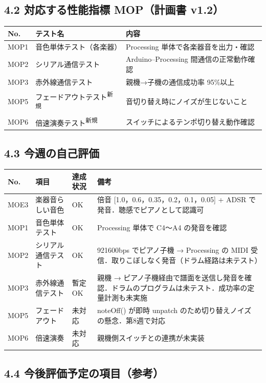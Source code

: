 \documentclass[a4paper,11pt]{ltjsarticle}
\providecommand{\％}{\%}
\begin{document}
\subsection*{4.2 対応する性能指標 MOP（計画書 v1.2）}

\begin{longtable}{|p{1.2cm}|p{3.6cm}|p{9.0cm}|}
\hline
\rowcolor[gray]{0.9}
No. & テスト名 & 内容 \\
\hline
MOP1 & 音色単体テスト（各楽器） & Processing 単体で各楽器音を出力・確認 \\
\hline
MOP2 & シリアル通信テスト & Arduino--Processing 間通信の正常動作確認 \\
\hline
MOP3 & 赤外線通信テスト & 親機→子機の通信成功率 95\％以上 \\
\hline
MOP5 & フェードアウトテスト\textsuperscript{新規} & 音切り替え時にノイズが生じないこと \\
\hline
MOP6 & 倍速演奏テスト\textsuperscript{新規} & スイッチによるテンポ切り替え動作確認 \\
\hline
\end{longtable}

\subsection*{4.3 今週の自己評価}

\begin{longtable}{|p{1.2cm}|p{3.5cm}|p{2cm}|p{8cm}|}
\hline
\rowcolor[gray]{0.9}
No. & 項目 & 達成状況 & 備考 \\
\hline
MOE3 & 楽器音らしい音色 & OK & 倍音 [1.0，0.6，0.35，0.2，0.1，0.05] + ADSR で発音．聴感でピアノとして認識可 \\
\hline
MOP1 & 音色単体テスト & OK & Processing 単体で C4〜A4 の発音を確認 \\
\hline
MOP2 & シリアル通信テスト & OK & 921600bps でピアノ子機 → Processing の MIDI 受信．取りこぼしなく発音（ドラム経路は未テスト） \\
\hline
MOP3 & 赤外線通信テスト & 暫定OK & 親機 → ピアノ子機経由で譜面を送信し発音を確認．ドラムのプログラムは未テスト．成功率の定量計測も未実施 \\
\hline
MOP5 & フェードアウト & 未対応 & noteOff() が即時 unpatch のため切り替えノイズの懸念．第8週で対応 \\
\hline
MOP6 & 倍速演奏 & 未対応 & 親機側スイッチとの連携が未実装 \\
\hline
\end{longtable}

\subsection*{4.4 今後評価予定の項目（参考）}
\end{document}
